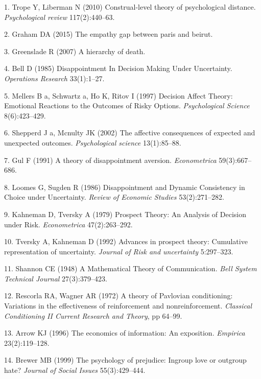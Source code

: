 \documentclass[9pt,twocolumn,twoside,]{pnas-new}
\begin{document}
\hypertarget{refs}{}
\hypertarget{ref-Trope2010}{}
1. Trope Y, Liberman N (2010) Construal-level theory of psychological
distance. \emph{Psychological review} 117(2):440--63.

\hypertarget{ref-Graham2015}{}
2. Graham DA (2015) The empathy gap between paris and beirut.

\hypertarget{ref-Greenslade2007}{}
3. Greenslade R (2007) A hierarchy of death.

\hypertarget{ref-Bell1985}{}
4. Bell D (1985) Disappointment In Decision Making Under Uncertainty.
\emph{Operations Research} 33(1):1--27.

\hypertarget{ref-Mellers1997}{}
5. Mellers B a, Schwartz a, Ho K, Ritov I (1997) Decision Affect Theory:
Emotional Reactions to the Outcomes of Risky Options.
\emph{Psychological Science} 8(6):423--429.

\hypertarget{ref-Shepperd2002}{}
6. Shepperd J a, Mcnulty JK (2002) The affective consequences of
expected and unexpected outcomes. \emph{Psychological science}
13(1):85--88.

\hypertarget{ref-Gul1991}{}
7. Gul F (1991) A theory of disappointment aversion. \emph{Econometrica}
59(3):667--686.

\hypertarget{ref-Loomes1986}{}
8. Loomes G, Sugden R (1986) Disappointment and Dynamic Consistency in
Choice under Uncertainty. \emph{Review of Economic Studies}
53(2):271--282.

\hypertarget{ref-Kahneman1979}{}
9. Kahneman D, Tversky A (1979) Prospect Theory: An Analysis of Decision
under Risk. \emph{Econometrica} 47(2):263--292.

\hypertarget{ref-Tversky1992}{}
10. Tversky A, Kahneman D (1992) Advances in prospect theory: Cumulative
representation of uncertainty. \emph{Journal of Risk and uncertainty}
5:297--323.

\hypertarget{ref-Shannon1948}{}
11. Shannon CE (1948) A Mathematical Theory of Communication. \emph{Bell
System Technical Journal} 27(3):379--423.

\hypertarget{ref-Rescorla1972}{}
12. Rescorla RA, Wagner AR (1972) A theory of Pavlovian conditioning:
Variations in the effectiveness of reinforcement and nonreinforcement.
\emph{Classical Conditioning II Current Research and Theory}, pp 64--99.

\hypertarget{ref-Arrow1996}{}
13. Arrow KJ (1996) The economics of information: An exposition.
\emph{Empirica} 23(2):119--128.

\hypertarget{ref-Brewer1999}{}
14. Brewer MB (1999) The psychology of prejudice: Ingroup love or
outgroup hate? \emph{Journal of Social Issues} 55(3):429--444.
\end{document}
